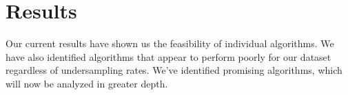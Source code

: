 \documentclass[fleqn,moreauthors,10pt]{ds_report}
\begin{document}

% 




\section*{Results}

 Our current results have shown us the feasibility of individual algorithms. We have also identified algorithms that appear to perform poorly for our dataset regardless of undersampling rates. We've identified promising algorithms, which will now be analyzed in greater depth.


\end{document}
